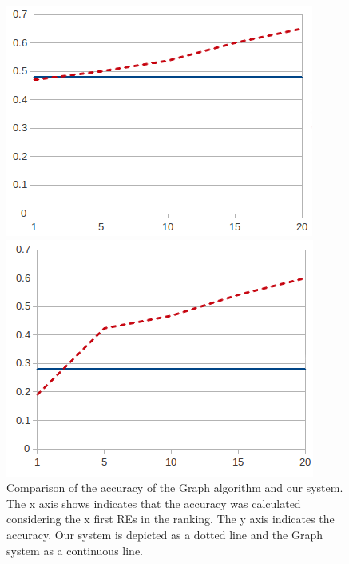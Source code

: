 \begin{figure}[ht]
\begin{minipage}{0.50\linewidth}
\centering
\includegraphics[width=\textwidth]{images/furniturePrec.png}
\end{minipage}
\begin{minipage}{0.50\linewidth}
\centering
\includegraphics[width=\textwidth]{images/precP.png}
\end{minipage}
\caption{Comparison of the accuracy of the Graph algorithm and our system. The x axis shows indicates that the accuracy was calculated considering the x first REs in the ranking. The y axis indicates the accuracy. Our system is depicted as a dotted line and the Graph system as a continuous line.\label{graficoPresicion}}
\end{figure}


